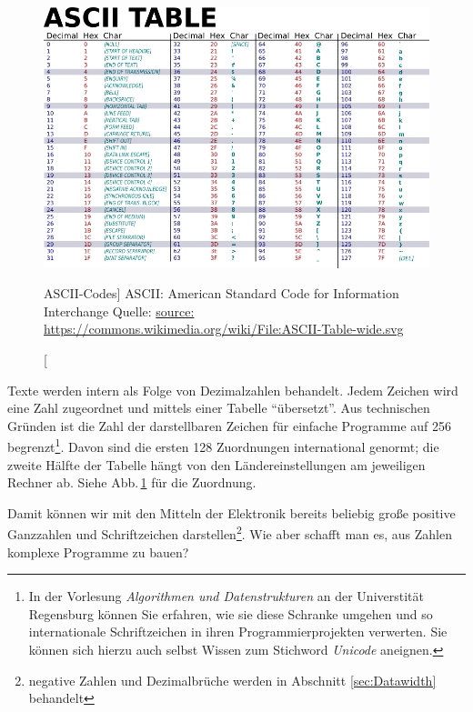 \begin{figure}[b!]
\includegraphics[width=\linewidth]{./gfx/ASCII_table}\newline
\caption
	[ASCII-Codes]
	{ASCII: American Standard Code for Information Interchange\newline
         Quelle: \url{source: https://commons.wikimedia.org/wiki/File:ASCII-Table-wide.svg}
    }
\label{fig:ASCII}
\end{figure}
Texte werden intern als Folge von Dezimalzahlen behandelt. Jedem Zeichen wird eine Zahl zugeordnet und mittels einer Tabelle \enquote{übersetzt}. Aus technischen Gründen ist die Zahl der darstellbaren Zeichen für einfache Programme auf 256 begrenzt\footnote{In der Vorlesung \emph{Algorithmen und Datenstrukturen} an der Universtität Regensburg können Sie erfahren, wie sie diese Schranke umgehen und so \eg internationale Schriftzeichen in ihren Programmierprojekten verwerten. Sie können sich hierzu auch selbst Wissen zum Stichword \emph{Unicode} aneignen.}. Davon sind die ersten 128 Zuordnungen international genormt; die zweite Hälfte der Tabelle hängt von den Ländereinstellungen am jeweiligen Rechner ab. Siehe Abb.\,\ref{fig:ASCII} für die Zuordnung.

Damit können wir mit den Mitteln der Elektronik bereits beliebig große positive Ganzzahlen und Schriftzeichen darstellen\footnote{negative Zahlen und Dezimalbrüche werden in Abschnitt \ref{sec:Datawidth} behandelt}. Wie aber schafft man es, aus Zahlen komplexe Programme zu bauen?

